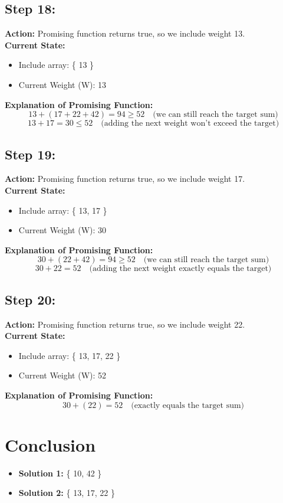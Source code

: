 \documentclass[12pt]{article}
\begin{document}
\subsection*{Step 18:}
\textbf{Action:} Promising function returns true, so we include weight 13. \\
\textbf{Current State:} 
\begin{itemize}
    \item Include array: \{ 13 \}
    \item Current Weight (W): 13
\end{itemize}
\textbf{Explanation of Promising Function:}
\[
13 + (17 + 22 + 42) = 94 \geq 52 \quad \text{(we can still reach the target sum)}
\]
\[
13 + 17 = 30 \leq 52 \quad \text{(adding the next weight won't exceed the target)}
\]

\subsection*{Step 19:}
\textbf{Action:} Promising function returns true, so we include weight 17. \\
\textbf{Current State:} 
\begin{itemize}
    \item Include array: \{ 13, 17 \}
    \item Current Weight (W): 30
\end{itemize}
\textbf{Explanation of Promising Function:}
\[
30 + (22 + 42) = 94 \geq 52 \quad \text{(we can still reach the target sum)}
\]
\[
30 + 22 = 52 \quad \text{(adding the next weight exactly equals the target)}
\]

\subsection*{Step 20:}
\textbf{Action:} Promising function returns true, so we include weight 22. \\
\textbf{Current State:} 
\begin{itemize}
    \item Include array: \{ 13, 17, 22 \}
    \item Current Weight (W): 52
\end{itemize}
\textbf{Explanation of Promising Function:}
\[
30 + (22) = 52 \quad \text{(exactly equals the target sum)}
\]

\section*{Conclusion}
\begin{itemize}
    \item \textbf{Solution 1:} \{ 10, 42 \}
    \item \textbf{Solution 2:} \{ 13, 17, 22 \}
\end{itemize}
\end{document}
